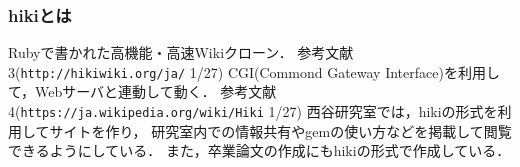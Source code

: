 \subsubsection{hikiとは}
Rubyで書かれた高機能・高速Wikiクローン．
参考文献3(\verb|http://hikiwiki.org/ja/| 1/27)
CGI(Commond Gateway Interface)を利用して，Webサーバと連動して動く．
参考文献4(\verb|https://ja.wikipedia.org/wiki/Hiki| 1/27)
西谷研究室では，hikiの形式を利用してサイトを作り，
研究室内での情報共有やgemの使い方などを掲載して閲覧できるようにしている．
また，卒業論文の作成にもhikiの形式で作成している．


